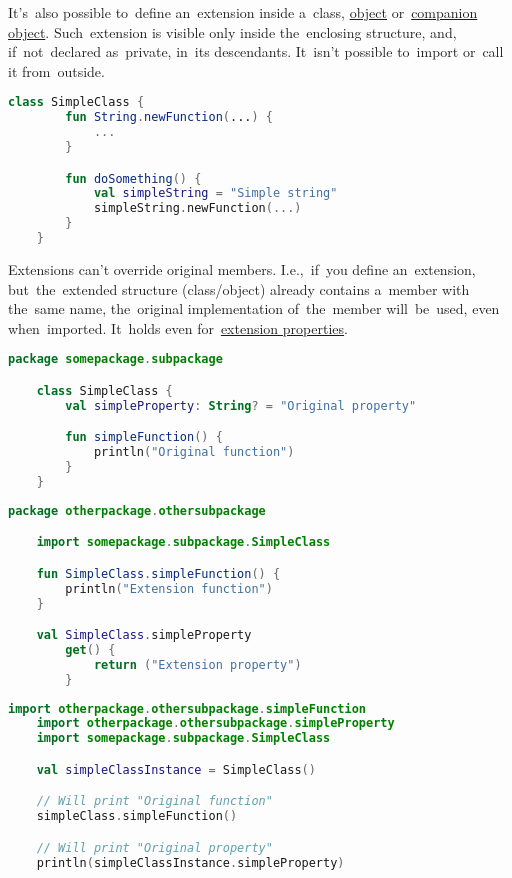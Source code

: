 \noindent It's~also possible to~define an~extension inside a~class, \hyperref[kotlinobject]{object} or~\hyperref[kotlincompanionobject]{companion object}.
Such~extension is visible only inside the~enclosing structure, and, if~not~declared as~private, in~its descendants.
It~isn't possible to~import or~call it from~outside.
\newpage

\begin{lstlisting}[language=Kotlin, title={Extension definition}]
    class SimpleClass {
        fun String.newFunction(...) {
            ...
        }

        fun doSomething() {
            val simpleString = "Simple string"
            simpleString.newFunction(...)
        }
    }
\end{lstlisting}

Extensions can't override original members.
I.e.,~if~you define an~extension, but~the~extended structure (class/object) already contains a~member with the~same name, the~original implementation of~the~member will~be~used, even when~imported.
It~holds even for~\hyperref[kotlinextensionproperty]{extension properties}.

\enlargethispage{20mm}
\thispagestyle{empty}
\example
\begin{lstlisting}[language=Kotlin, title={Class with some members}]
    package somepackage.subpackage

    class SimpleClass {
        val simpleProperty: String? = "Original property"

        fun simpleFunction() {
            println("Original function")
        }
    }
\end{lstlisting}
\begin{lstlisting}[language=Kotlin, title={Extensions with same names}]
    package otherpackage.othersubpackage

    import somepackage.subpackage.SimpleClass

    fun SimpleClass.simpleFunction() {
        println("Extension function")
    }

    val SimpleClass.simpleProperty
        get() {
            return ("Extension property")
        }
\end{lstlisting}
\newpage

\begin{lstlisting}[language=Kotlin, title={Behavior}]
    import otherpackage.othersubpackage.simpleFunction
    import otherpackage.othersubpackage.simpleProperty
    import somepackage.subpackage.SimpleClass

    val simpleClassInstance = SimpleClass()

    // Will print "Original function"
    simpleClass.simpleFunction()

    // Will print "Original property"
    println(simpleClassInstance.simpleProperty)
\end{lstlisting}
\newline

